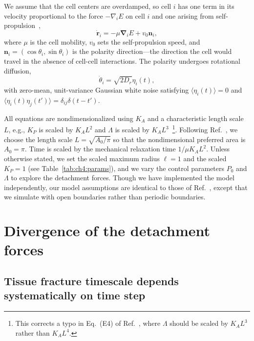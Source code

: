 We assume that the cell centers are overdamped, so cell $i$ has one term in its velocity proportional to the force $-\nabla_i E$ on cell $i$ and one arising from self-propulsion~\cite{huang2023bridging},
\begin{equation}
\label{eq:ch4:EOM}
    \dot{\mathbf{r}}_i = -\mu\bm{\nabla}_i E + v_0\mathbf{n}_i,
\end{equation}
where $\mu$ is the cell mobility, $v_0$ sets the self-propulsion speed, and $\mathbf{n}_i=(\cos\theta_i,\sin\theta_i)$ is the polarity direction---the direction the cell would travel in the absence of cell-cell interactions. The polarity undergoes rotational diffusion,
\begin{equation}
\label{eq:ch4:diffusion}
    \dot{\theta}_i=\sqrt{2D_r}\eta_i(t),
\end{equation}
with zero-mean, unit-variance Gaussian white noise satisfying $\langle\eta_i(t)\rangle=0$ and $\langle\eta_i(t)\eta_j(t')\rangle=\delta_{ij}\delta(t-t')$.

All equations are nondimensionalized using $K_A$ and a characteristic length scale $L$, e.g., $K_P$ is scaled by $K_A L^2$ and $\Lambda$ is scaled by $K_A L^3$~\footnote{This corrects a typo in Eq.~(E4) of Ref.~\cite{teomy2018confluent}, where $\Lambda$ should be scaled by $K_AL^3$ rather than $K_AL^4$.}.
Following Ref.~\cite{huang2023bridging}, we choose the length scale $L=\sqrt{A_0/\pi}$ so that the nondimensional preferred area is $A_0=\pi$.
Time is scaled by the mechanical relaxation time $1/\mu K_A L^2$. Unless otherwise stated, we set the scaled maximum radius $\ell=1$ and the scaled $K_P=1$ (see Table~\ref{tab:ch4:params}), and we vary the control parameters $P_0$ and $\Lambda$ to explore the detachment forces. Though we have implemented the model independently, our model assumptions are identical to those of Ref.~\cite{huang2023bridging}, except that we simulate with open boundaries rather than periodic boundaries.


\section{Divergence of the detachment forces}

\subsection{Tissue fracture timescale depends systematically on time step}
\label{sec:ch4:timestep}

